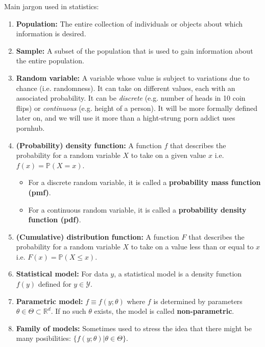 \begin{definition}
   Main jargon used in statistics:
   \begin{enumerate}
      \item \textbf{Population:} The entire collection of individuals or objects about which information is desired.
      \item \textbf{Sample:} A subset of the population that is used to gain information about the entire population.
      \item \textbf{Random variable:} A variable whose value is subject to variations due to chance (i.e. randomness). It can take on different values, each with an associated probability. It can be \textit{discrete} (e.g. number of heads in 10 coin flips) or \textit{continuous} (e.g. height of a person).
      It will be more formally defined later on, and we will use it more than a hight-strung porn addict uses pornhub. 
      \item \textbf{(Probability) density function:} A function $f$ that describes the probability for a random variable $X$ to take on a given value $x$ i.e. $f(x) = \mathbb{P}(X=x)$.
      \begin{itemize}
         \item For a discrete random variable, it is called a \textbf{probability mass function (pmf)}.
         \item For a continuous random variable, it is called a \textbf{probability density function (pdf)}.
      \end{itemize}
      \item \textbf{(Cumulative) distribution function:} A function $F$ that describes the probability for a random variable $X$ to take on a value less than or equal to $x$ i.e. $F(x) = \mathbb{P}(X \leq x)$.
      \item \textbf{Statistical model:} For data $y$, a statistical model is a density function $f(y)$ defined for $y \in \mathcal{Y}$.
      \item \textbf{Parametric model:} $f \equiv f(y;\theta)$ where $f$ is determined by parameters $\theta \in \Theta \subset \mathbb{R}^d$. If no such $\theta$ exists, 
      the model is called \textbf{non-parametric}.
      \item \textbf{Family of models:} Sometimes used to stress the idea that there might be many posibilities: $\{f(y;\theta) \vert \theta \in \Theta\}$.
   \end{enumerate}
\end{definition}

